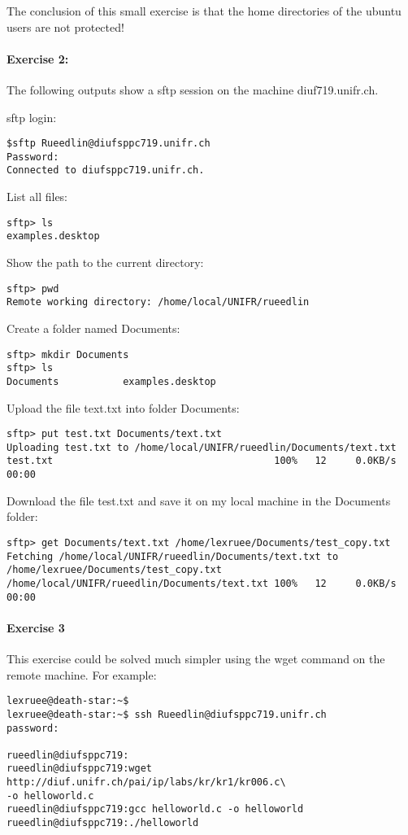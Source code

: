 \documentclass[12pt]{article}
\begin{document}
The conclusion of this small exercise is that the home directories of the ubuntu users are not protected!
\paragraph*{Exercise 2:}
The following outputs show a sftp session on the machine diuf719.unifr.ch.

sftp login:
\begin{lstlisting}
$sftp Rueedlin@diufsppc719.unifr.ch
Password:
Connected to diufsppc719.unifr.ch.
\end{lstlisting}
List all files:
\begin{lstlisting}
sftp> ls
examples.desktop    
\end{lstlisting}

Show the path to the current directory:
\begin{lstlisting}
sftp> pwd
Remote working directory: /home/local/UNIFR/rueedlin
\end{lstlisting}

Create a folder named Documents:
\begin{lstlisting}
sftp> mkdir Documents
sftp> ls
Documents           examples.desktop
\end{lstlisting}

Upload the file text.txt into folder Documents:
\begin{lstlisting}
sftp> put test.txt Documents/text.txt
Uploading test.txt to /home/local/UNIFR/rueedlin/Documents/text.txt
test.txt                                      100%   12     0.0KB/s   00:00 
\end{lstlisting}

Download the file test.txt and save it on my local machine in the Documents folder:
\begin{lstlisting}
sftp> get Documents/text.txt /home/lexruee/Documents/test_copy.txt
Fetching /home/local/UNIFR/rueedlin/Documents/text.txt to 
/home/lexruee/Documents/test_copy.txt
/home/local/UNIFR/rueedlin/Documents/text.txt 100%   12     0.0KB/s   00:00 
\end{lstlisting}

\paragraph{Exercise 3}
This exercise could be solved much simpler using the wget command on the remote machine.
For example:
\begin{lstlisting}
lexruee@death-star:~$ 
lexruee@death-star:~$ ssh Rueedlin@diufsppc719.unifr.ch
password:

rueedlin@diufsppc719:
rueedlin@diufsppc719:wget http://diuf.unifr.ch/pai/ip/labs/kr/kr1/kr006.c\  
-o helloworld.c
rueedlin@diufsppc719:gcc helloworld.c -o helloworld
rueedlin@diufsppc719:./helloworld
\end{lstlisting}
\end{document}
